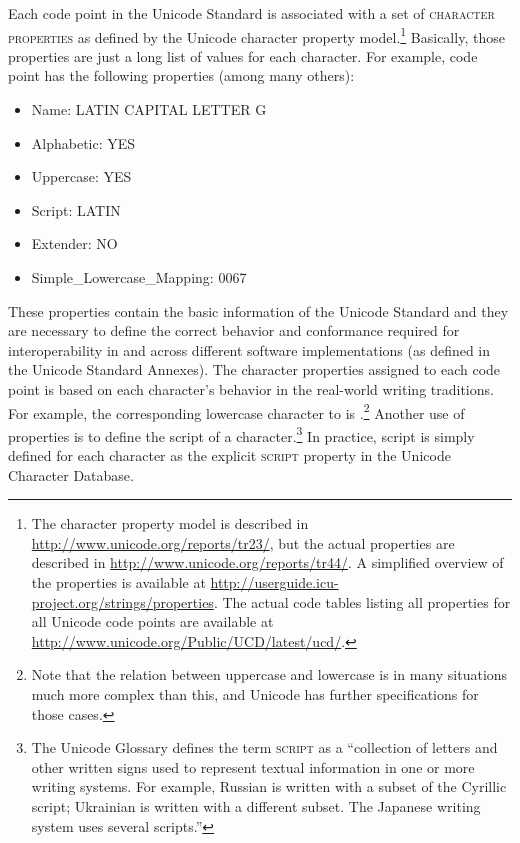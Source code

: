 Each code point in the Unicode Standard is associated with a set of
\textsc{character properties} as defined by the Unicode character property
model.\footnote{The character property model is described in
\url{http://www.unicode.org/reports/tr23/}, but the actual properties are
described in \url{http://www.unicode.org/reports/tr44/}. A simplified overview
of the properties is available at
\url{http://userguide.icu-project.org/strings/properties}. The actual code
tables listing all properties for all Unicode code points are available at
\url{http://www.unicode.org/Public/UCD/latest/ucd/}.} Basically, those
properties are just a long list of values for each character. For example, code
point  has the following properties (among many others): 
\begin{itemize}
	\item Name: LATIN CAPITAL LETTER G 
	\item Alphabetic: YES 
	\item Uppercase: YES 
	\item Script: LATIN 
	\item Extender: NO 
	\item Simple\_Lowercase\_Mapping: 0067 
\end{itemize}

These properties contain the basic information of the Unicode Standard and they
are necessary to define the correct behavior and conformance required for
interoperability in and across different software implementations (as defined in
the Unicode Standard Annexes). The character properties assigned to each code
point is based on each character's behavior in the real-world writing
traditions. For example, the corresponding lowercase character to  is
.\footnote{Note that the relation between uppercase and lowercase is in
many situations much more complex than this, and Unicode has further
specifications for those cases.} Another use of properties is to define the
script of a character.\footnote{The Unicode Glossary defines the term \textsc{script} as
a ``collection of letters and other written signs used to represent textual
information in one or more writing systems. For example, Russian is written with
a subset of the Cyrillic script; Ukrainian is written with a different subset.
The Japanese writing system uses several scripts.''} In practice, script is
simply defined for each character as the explicit \textsc{script} property in
the Unicode Character Database.

